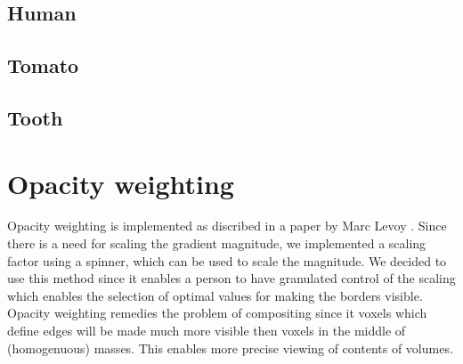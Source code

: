 \documentclass[a4paper,twoside,11pt]{article}
\begin{document}
 \subsection{Human}
 
 \subsection{Tomato}
 
 \subsection{Tooth}
 
 \newpage
 \section{Opacity weighting}
 Opacity weighting is implemented as discribed in a paper by Marc Levoy \cite{levoy_m}. Since there is a need for scaling the gradient magnitude, we implemented a scaling factor using a spinner, which can be used to scale the magnitude. We decided to use this method since it enables a person to have granulated control of the scaling which enables the selection of optimal values for making the borders visible. Opacity weighting remedies the problem of compositing since it voxels which define edges will be made much more visible then voxels in the middle of (homogenuous) masses. This enables more precise viewing of contents of volumes.
 
\end{document}
